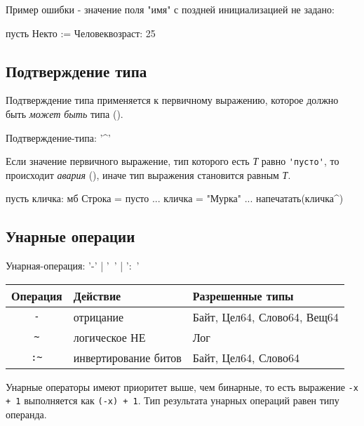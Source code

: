 Пример ошибки - значение поля "имя" с поздней инициализацией не задано:
\begin{SampleErr}[vspace=2pt]
пусть Некто := Человек{возраст: 25}
\end{SampleErr}

\hypertarget{confirmation}{%
\subsection{Подтверждение типа}\label{expr:confirmation}}

Подтверждение типа применяется к первичному выражению, которое должно быть \emph{может быть} типа (). 

\begin{Grammar}
Подтверждение-типа: '^'
\end{Grammar}   

Если значение первичного выражение, тип которого есть  \emph{Т} равно \verb+'пусто'+, 
то происходит \emph{авария} (), иначе тип выражения становится равным \emph{Т}.


\begin{Trivil}[vspace=2pt]
пусть кличка: мб Строка = пусто
...
кличка = "Мурка"
...
напечатать(кличка^)
\end{Trivil}

\hypertarget{unary-ops}{%
\subsection{Унарные операции}\label{expr:unary-ops}}

\begin{Grammar}
Унарная-операция: '-' | '~' | ':~' 
\end{Grammar}   

\begin{tabular}[c]{c|l|l}
\textbf{Операция} & \textbf{Действие} &  \textbf{Разрешенные типы} \\ 
\hline
\verb|-| & отрицание & Байт, Цел64, Слово64, Вещ64 \\
\verb|~| & логическое НЕ & Лог \\
\verb|:~| & инвертирование битов & Байт, Цел64, Слово64 \\
\hline
\end{tabular}

\bigskip
Унарные операторы имеют приоритет выше, чем бинарные, то есть выражение \verb|-х + 1| выполняется как \verb|(-х) + 1|.
Тип результата унарных операций равен типу операнда.

